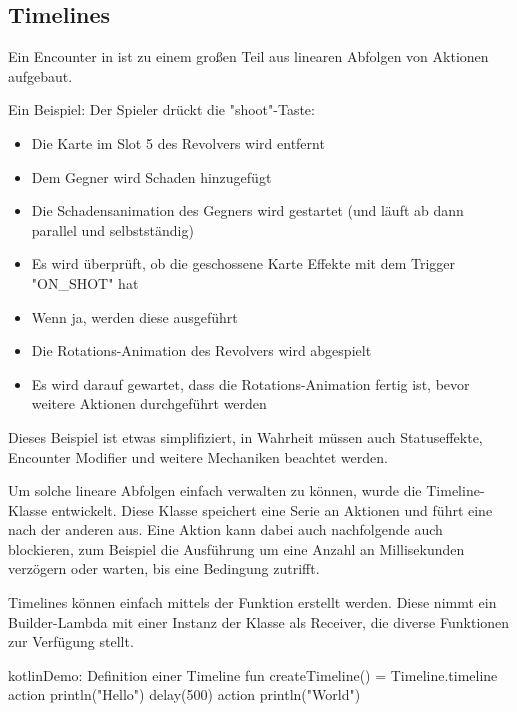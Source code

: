 
\subsection{Timelines}\label{subsec:timelines}

\renewcommand{\kapitelautor}{Autor: Marvin Kurka}

Ein Encounter in \FF ist zu einem großen Teil aus linearen Abfolgen von Aktionen aufgebaut.

Ein Beispiel: Der Spieler drückt die "shoot"-Taste:
\begin{itemize}
    \setlength\itemsep{0.2em}
    \item Die Karte im Slot 5 des Revolvers wird entfernt
    \item Dem Gegner wird Schaden hinzugefügt
    \item Die Schadensanimation des Gegners wird gestartet (und läuft ab dann parallel und selbstständig)
    \item Es wird überprüft, ob die geschossene Karte Effekte mit dem Trigger "ON\_SHOT" hat
    \item Wenn ja, werden diese ausgeführt
    \item Die Rotations-Animation des Revolvers wird abgespielt
    \item Es wird darauf gewartet, dass die Rotations-Animation fertig ist, bevor weitere Aktionen durchgeführt werden
\end{itemize}

Dieses Beispiel ist etwas simplifiziert, in Wahrheit müssen auch Statuseffekte, Encounter Modifier und weitere Mechaniken
beachtet werden.

Um solche lineare Abfolgen einfach verwalten zu können, wurde die Timeline-Klasse entwickelt.
Diese Klasse speichert eine Serie an Aktionen und führt eine nach der anderen aus.
Eine Aktion kann dabei auch nachfolgende auch blockieren, zum Beispiel die Ausführung um eine Anzahl an
Millisekunden verzögern oder warten, bis eine Bedingung zutrifft.

Timelines können einfach mittels der  Funktion erstellt werden.
Diese nimmt ein Builder-Lambda mit einer Instanz der  Klasse als Receiver, die
diverse Funktionen zur Verfügung stellt.

\begin{codeBlock}{kotlin}{Demo: Definition einer Timeline}
fun createTimeline() = Timeline.timeline {
    action {
        println("Hello")
    }
    delay(500)
    action {
        println("World")
    }
}
\end{codeBlock}

